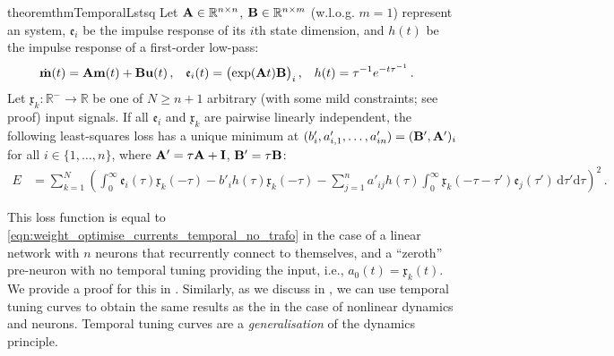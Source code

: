 \begin{restatable}{theorem}{thmTemporalLstsq}
	\label{thm:temporal_lstsq}
	Let $\mathbf{A} \in \mathbb{R}^{n \times n}$, $\mathbf{B} \in \mathbb{R}^{n \times m}$ (w.l.o.g. $m = 1$) represent an \LTI system, $\mathfrak{e}_i$ be the impulse response of its $i$th state dimension, and $h(t)$ be the impulse response of a first-order low-pass:
	\begin{align*}
		  \dot{\mathbf{m}}(t) &= \mathbf{A} \mathbf{m}(t) + \mathbf{B} \mathbf{u}(t)  \,, 
		& \mathfrak{e}_i(t) &= \big(\!\exp( \mathbf{A} t ) \mathbf{B} \big)_i \,,
		& h(t) &= \tau^{-1} e^{-t \tau^{-1}} \,.
	\end{align*}
	Let $\mathfrak{x}_k : \mathbb{R}^- \to \mathbb{R}$ be one of $N \geq n + 1$ arbitrary (with some mild constraints; see proof) input signals.
	If all $\mathfrak{e}_i$ and $\mathfrak{x}_k$ are pairwise linearly independent, the following least-squares loss has a unique minimum at $(b'_{i}, a'_{i, 1}, \ldots, a'_{in}) = ( \mathbf{B}', \mathbf{A}' )_i$ for all $i \in \{1, \ldots, n\}$, where $\mathbf{A}' = \tau \mathbf{A} + \mathbf{I}$, $\mathbf{B}' = \tau \mathbf{B}$:
	\begin{align*}
		E &=\sum_{k = 1}^{N} \left(
					\int_{0}^{\infty} \!\! \mathfrak{e}_i(\tau) \mathfrak{x}_k(-\tau)
		          - b'_{i} h(\tau) \mathfrak{x}_k(-\tau)
		          - \sum_{j=1}^n a'_{ij} h(\tau) \int_0^\infty \!\! \mathfrak{x}_k(-\tau - \tau') \mathfrak{e}_j(\tau') \, \mathrm{d}\tau' \mathrm{d}\tau \right)^2 \,.
	\end{align*}
\end{restatable}
\noindent This loss function is equal to \cref{eqn:weight_optimise_currents_temporal_no_trafo} in the case of a linear network with $n$ neurons that recurrently connect to themselves, and a \enquote{zeroth} pre-neuron with no temporal tuning providing the input, i.e., $a_0(t) = \mathfrak{x}_k(t)$.
We provide a proof for this in .
Similarly, as we discuss in , we can use temporal tuning curves to obtain the same results as the \NEF in the case of nonlinear dynamics and neurons.
Temporal tuning curves are a \emph{generalisation} of the \NEF dynamics principle.

